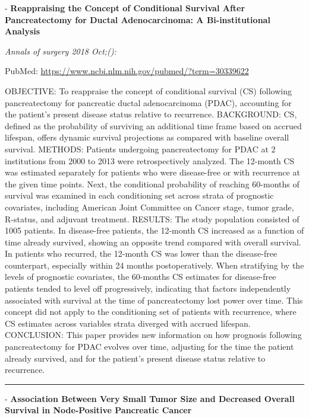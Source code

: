 \documentclass[]{article}
\begin{document}
 - \textbf{Reappraising the Concept of Conditional Survival After
Pancreatectomy for Ductal Adenocarcinoma: A Bi-institutional Analysis}

\emph{Annals of surgery 2018 Oct;():}

PubMed: \url{https://www.ncbi.nlm.nih.gov/pubmed/?term=30339622}

OBJECTIVE: To reappraise the concept of conditional survival (CS)
following pancreatectomy for pancreatic ductal adenocarcinoma (PDAC),
accounting for the patient's present disease status relative to
recurrence. BACKGROUND: CS, defined as the probability of surviving an
additional time frame based on accrued lifespan, offers dynamic survival
projections as compared with baseline overall survival. METHODS:
Patients undergoing pancreatectomy for PDAC at 2 institutions from 2000
to 2013 were retrospectively analyzed. The 12-month CS was estimated
separately for patients who were disease-free or with recurrence at the
given time points. Next, the conditional probability of reaching
60-months of survival was examined in each conditioning set across
strata of prognostic covariates, including American Joint Committee on
Cancer stage, tumor grade, R-status, and adjuvant treatment. RESULTS:
The study population consisted of 1005 patients. In disease-free
patients, the 12-month CS increased as a function of time already
survived, showing an opposite trend compared with overall survival. In
patients who recurred, the 12-month CS was lower than the disease-free
counterpart, especially within 24 months postoperatively. When
stratifying by the levels of prognostic covariates, the 60-months CS
estimates for disease-free patients tended to level off progressively,
indicating that factors independently associated with survival at the
time of pancreatectomy lost power over time. This concept did not apply
to the conditioning set of patients with recurrence, where CS estimates
across variables strata diverged with accrued lifespan. CONCLUSION: This
paper provides new information on how prognosis following pancreatectomy
for PDAC evolves over time, adjusting for the time the patient already
survived, and for the patient's present disease status relative to
recurrence.

{}

{}

\begin{center}\rule{0.5\linewidth}{\linethickness}\end{center}

 - \textbf{Association Between Very Small Tumor Size and Decreased
Overall Survival in Node-Positive Pancreatic Cancer}
\end{document}
